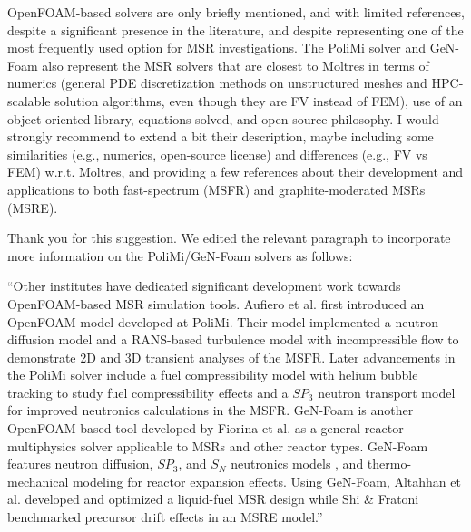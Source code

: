 \documentclass[answers,12pt]{exam}
\begin{document}
\begin{questions}
        \question OpenFOAM-based solvers are only briefly mentioned, and with
        limited references, despite a significant presence in the literature,
        and despite representing one of the most frequently used option for MSR
        investigations. The PoliMi solver and GeN-Foam also represent the MSR
        solvers that are closest to Moltres in terms of numerics (general PDE
        discretization methods on unstructured meshes and HPC-scalable solution
        algorithms,  even though they are FV instead of FEM), use of an
        object-oriented library, equations solved, and open-source philosophy.
        I would strongly recommend to extend a bit their description, maybe
        including some similarities (e.g., numerics, open-source license) and
        differences (e.g., FV vs FEM) w.r.t. Moltres, and providing a few
        references about their development and applications to both
        fast-spectrum (MSFR) and graphite-moderated MSRs (MSRE).
        \begin{solution}
        	Thank you for this suggestion. We edited the relevant paragraph to
        	incorporate more information on the PoliMi/GeN-Foam solvers as
        	follows:
        	
        	``Other institutes have dedicated significant development work towards
OpenFOAM-based \gls{MSR} simulation tools. Aufiero et al.
\cite{aufiero_development_2014} first introduced an OpenFOAM model developed
at \gls{PoliMi}. Their model implemented a neutron diffusion model and a
\gls{RANS}-based turbulence model with incompressible flow to demonstrate 2D
and 3D transient analyses of the \gls{MSFR}. Later advancements in the
\gls{PoliMi} solver include a fuel compressibility model with helium bubble
tracking to study fuel compressibility effects
\cite{cervi_development_2019} and a $SP_3$ neutron transport
model for improved neutronics calculations \cite{cervi_development_2019-1} in
the \gls{MSFR}. GeN-Foam is another OpenFOAM-based tool developed by Fiorina
et al. \cite{fiorina_gen-foam_2015} as a general reactor multiphysics solver
applicable to \glspl{MSR} and other reactor types. GeN-Foam features neutron
diffusion, $SP_3$, and $S_N$ neutronics models 
\cite{fiorina_development_2016,fiorina_gen-foam_2015,fiorina_detailed_2019},
and thermo-mechanical modeling for reactor expansion effects. Using GeN-Foam,
Altahhan et al. \cite{altahhan_preliminary_2020} developed and optimized a
liquid-fuel \gls{MSR} design while Shi \& Fratoni \cite{shi_gen-foam_2021}
benchmarked precursor drift effects in an \gls{MSRE} model.''
            

\end{solution}
\end{questions}
\end{document}
